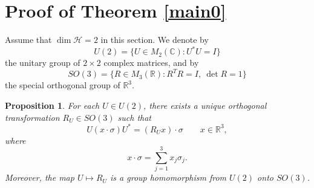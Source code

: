 \documentclass[11pt]{amsart}
\newtheorem{proposition}[theorem]{Proposition}
\theoremstyle{remark}
\newcommand{\cH}{{\mathcal{H}}}
\begin{document}
\section{Proof of Theorem \ref{main0}} 
Assume that $\dim \cH=2$ in this section.
We denote by
\[
U(2)=\{U\in M_2(\mathbb C):U^*U=I\}
\]
the unitary group of $2\times2$ complex matrices, and by
\[
SO(3)=\{R\in M_3(\mathbb R):R^TR=I,\ \det R=1\}
\]
the special orthogonal group of $\mathbb R^3$. %
\begin{proposition}{\cite[Proposition 5.5]{Land}}\label{Bloch_representation}
For each $U\in U(2)$, there exists a unique orthogonal transformation
$R_U\in SO(3)$ such that
\[
U(x\cdot \sigma)U^*=(R_Ux)\cdot\sigma
\qquad x \in\mathbb R^3,
\]
where
\[
x\cdot\sigma=\sum_{j=1}^3x_j\sigma_j.
\]
Moreover, the map $U \mapsto R_U$ is a group homomorphism from $U(2)$ onto $SO(3)$.  
\end{proposition}
\end{document}
